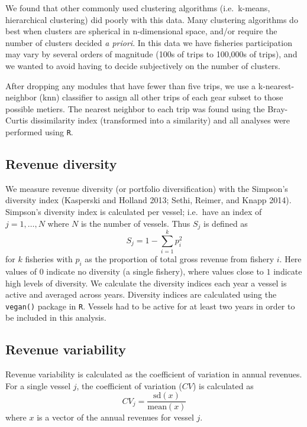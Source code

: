 \documentclass[]{article}
\begin{document}
We found that other commonly used clustering algorithms (i.e.~k-means,
hierarchical clustering) did poorly with this data. Many clustering
algorithms do best when clusters are spherical in n-dimensional space,
and/or require the number of clusters decided \emph{a priori}. In this
data we have fisheries participation may vary by several orders of
magnitude (100s of trips to 100,000s of trips), and we wanted to avoid
having to decide subjectively on the number of clusters.

After dropping any modules that have fewer than five trips, we use a
k-nearest-neighbor (knn) classifier to assign all other trips of each
gear subset to those possible metiers. The nearest neighbor to each trip
was found using the Bray-Curtis dissimilarity index (transformed into a
similarity) and all analyses were performed using \texttt{R}.

\subsection{Revenue diversity}\label{revenue-diversity}

We measure revenue diversity (or portfolio diversification) with the
Simpson's diversity index (Kasperski and Holland 2013; Sethi, Reimer,
and Knapp 2014). Simpson's diversity index is calculated per vessel;
i.e.~have an index of \(j = 1,\dots,N\) where \(N\) is the number of
vessels. Thus \(S_j\) is defined as \[ S_j = 1 - \sum^k_{i=1}p_i^2\] for
\(k\) fisheries with \(p_i\) as the proportion of total gross revenue
from fishery \(i\). Here values of \(0\) indicate no diversity (a single
fishery), where values close to \(1\) indicate high levels of diversity.
We calculate the diversity indices each year a vessel is active and
averaged across years. Diversity indices are calculated using the
\texttt{vegan()} package in \texttt{R}. Vessels had to be active for at
least two years in order to be included in this analysis.

\subsection{Revenue variability}\label{revenue-variability}

Revenue variability is calculated as the coefficient of variation in
annual revenues. For a single vessel \(j\), the coefficient of variation
(\(CV\)) is calculated as \[CV_j = \frac{\text{sd}(x)}{\text{mean}(x)}\]
where \(x\) is a vector of the annual revenues for vessel \(j\).
\end{document}
